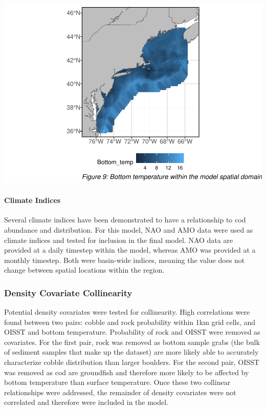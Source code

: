 \documentclass[
]{article}
\begin{document}
\includegraphics{ToR1_TechPaper_files/figure-latex/bottom temp-1.pdf}

\hypertarget{climate-indices}{%
\paragraph{Climate Indices}\label{climate-indices}}

Several climate indices have been demonstrated to have a relationship to cod abundance and distribution. For this model, NAO and AMO data were used as climate indices and tested for inclusion in the final model. NAO data are provided at a daily timestep within the model, whereas AMO was provided at a monthly timestep. Both were basin-wide indices, meaning the value does not change between spatial locations within the region.

\hypertarget{density-covariate-collinearity}{%
\subsubsection{Density Covariate Collinearity}\label{density-covariate-collinearity}}

Potential density covariates were tested for collinearity. High correlations were found between two pairs: cobble and rock probability within 1km grid cells, and OISST and bottom temperature. Probability of rock and OISST were removed as covariates. For the first pair, rock was removed as bottom sample grabs (the bulk of sediment samples that make up the dataset) are more likely able to accurately characterize cobble distribution than larger boulders. For the second pair, OISST was removed as cod are groundfish and therefore more likely to be affected by bottom temperature than surface temperature. Once these two collinear relationships were addressed, the remainder of density covariates were not correlated and therefore were included in the model.
\end{document}
